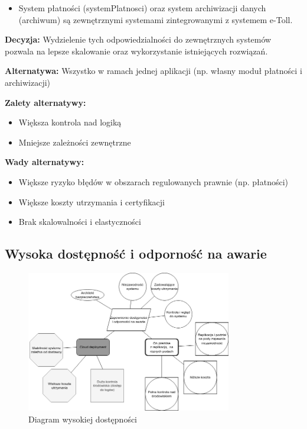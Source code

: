 \documentclass[12pt]{article}
\begin{document}
\begin{itemize}
\item System płatności (systemPlatnosci) oraz system archiwizacji danych (archiwum) są zewnętrznymi systemami zintegrowanymi z systemem e-Toll.
\end{itemize}

\textbf{Decyzja:} Wydzielenie tych odpowiedzialności do zewnętrznych systemów pozwala na lepsze skalowanie oraz wykorzystanie istniejących rozwiązań.

\textbf{Alternatywa:} Wszystko w ramach jednej aplikacji (np. własny moduł płatności i archiwizacji)

\textbf{Zalety alternatywy:}
\begin{itemize}
\item Większa kontrola nad logiką
\item Mniejsze zależności zewnętrzne
\end{itemize}

\textbf{Wady alternatywy:}
\begin{itemize}
\item Większe ryzyko błędów w obszarach regulowanych prawnie (np. płatności)
\item Większe koszty utrzymania i certyfikacji
\item Brak skalowalności i elastyczności
\end{itemize}

\subsection{Wysoka dostępność i odporność na awarie}
\begin{figure}[H]
\centering
\includegraphics[width=0.8\textwidth]{zapewnienie_dostepnosci_i_odpornosci_na_awarie.png}
\caption{Diagram wysokiej dostępności}
\label{fig:high-availability}
\end{figure}
\end{document}

